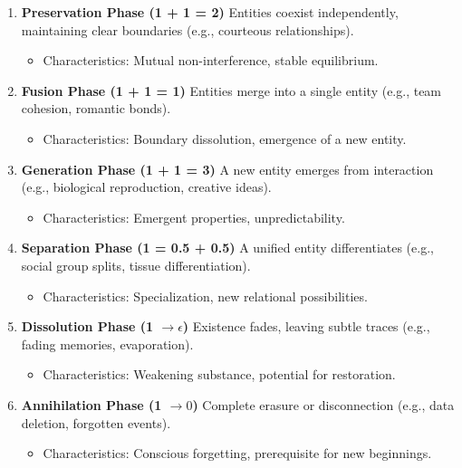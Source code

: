 \documentclass{article}
\begin{document}
\begin{enumerate}
    \item \textbf{Preservation Phase (1 + 1 = 2)}
    Entities coexist independently, maintaining clear boundaries (e.g., courteous relationships).
    \begin{itemize}
        \item Characteristics: Mutual non-interference, stable equilibrium.
    \end{itemize}

    \item \textbf{Fusion Phase (1 + 1 = 1)}
    Entities merge into a single entity (e.g., team cohesion, romantic bonds).
    \begin{itemize}
        \item Characteristics: Boundary dissolution, emergence of a new entity.
    \end{itemize}

    \item \textbf{Generation Phase (1 + 1 = 3)}
    A new entity emerges from interaction (e.g., biological reproduction, creative ideas).
    \begin{itemize}
        \item Characteristics: Emergent properties, unpredictability.
    \end{itemize}

    \item \textbf{Separation Phase (1 = 0.5 + 0.5)}
    A unified entity differentiates (e.g., social group splits, tissue differentiation).
    \begin{itemize}
        \item Characteristics: Specialization, new relational possibilities.
    \end{itemize}

    \item \textbf{Dissolution Phase (1 $\to \epsilon$)}
    Existence fades, leaving subtle traces (e.g., fading memories, evaporation).
    \begin{itemize}
        \item Characteristics: Weakening substance, potential for restoration.
    \end{itemize}

    \item \textbf{Annihilation Phase (1 $\to 0$)}
    Complete erasure or disconnection (e.g., data deletion, forgotten events).
    \begin{itemize}
        \item Characteristics: Conscious forgetting, prerequisite for new beginnings.
    \end{itemize}
\end{enumerate}
\end{document}
